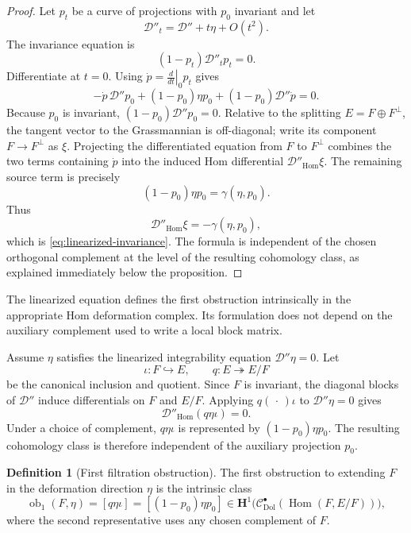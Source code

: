 \documentclass[11pt,reqno]{amsart}
\theoremstyle{definition}
\newtheorem{definition}[theorem]{Definition}
\theoremstyle{remark}
\newcommand{\cC}{\mathcal C}
\newcommand{\cD}{\mathcal D}
\newcommand{\Hom}{\operatorname{Hom}}
\newcommand{\Dol}{\mathrm{Dol}}
\begin{document}
\begin{proof}
Let $p_t$ be a curve of projections with $p_0$ invariant and let
\[
  \cD''_t=\cD''+t\eta+O(t^2).
\]
The invariance equation is
\[
  (1-p_t)\cD''_tp_t=0.
\]
Differentiate at $t=0$.  Using $\dot p=\left.\frac d{dt}\right|_0p_t$ gives
\[
  -\dot p\,\cD''p_0
  +(1-p_0)\eta p_0
  +(1-p_0)\cD''\dot p=0.
\]
Because $p_0$ is invariant, $(1-p_0)\cD''p_0=0$.  Relative to the splitting $E=F\oplus F^\perp$, the tangent vector to the Grassmannian is off-diagonal; write its component $F\to F^\perp$ as $\xi$.  Projecting the differentiated equation from $F$ to $F^\perp$ combines the two terms containing $\dot p$ into the induced Hom differential $\cD''_{\Hom}\xi$.  The remaining source term is precisely
\[
  (1-p_0)\eta p_0=\gamma(\eta,p_0).
\]
Thus
\[
  \cD''_{\Hom}\xi=-\gamma(\eta,p_0),
\]
which is \eqref{eq:linearized-invariance}.  The formula is independent of the chosen orthogonal complement at the level of the resulting cohomology class, as explained immediately below the proposition.
\end{proof}


The linearized equation defines the first obstruction intrinsically in the appropriate Hom deformation complex.  Its formulation does not depend on the auxiliary complement used to write a local block matrix.


Assume $\eta$ satisfies the linearized integrability equation $\cD''\eta=0$.  Let
\[
  \iota:F\hookrightarrow E,
  \qquad
  q:E\twoheadrightarrow E/F
\]
be the canonical inclusion and quotient.  Since $F$ is invariant, the diagonal blocks of $\cD''$ induce differentials on $F$ and $E/F$.  Applying $q(\,\cdot\,)\iota$ to $\cD''\eta=0$ gives
\[
  \cD''_{\Hom}(q\eta\iota)=0.
\]
Under a choice of complement, $q\eta\iota$ is represented by $(1-p_0)\eta p_0$.  The resulting cohomology class is therefore independent of the auxiliary projection $p_0$.

\begin{definition}[First filtration obstruction]\label{def:first-obstruction}
The first obstruction to extending $F$ in the deformation direction $\eta$ is the intrinsic class
\begin{equation}\label{eq:first-obstruction}
  \operatorname{ob}_1(F,\eta)
  =[q\eta\iota]
  =[(1-p_0)\eta p_0]
  \in
  \mathbf H^1\bigl(\cC^\bullet_{\Dol}(\Hom(F,E/F))\bigr),
\end{equation}
where the second representative uses any chosen complement of $F$.
\end{definition}
\end{document}
